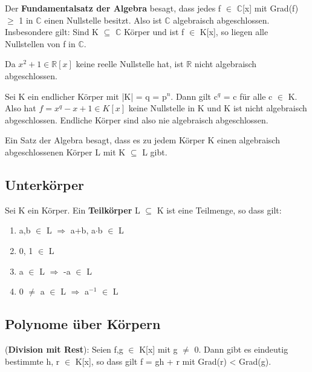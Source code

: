 \begin{remark}
\leavevmode
\begin{compactenum}
\item Der \textbf{Fundamentalsatz der Algebra} besagt, dass jedes f $\in$ $\mathbb{C}$[x] mit Grad(f) $\ge$ 1 in $\mathbb{C}$ einen Nullstelle besitzt. Also ist $\mathbb{C}$ algebraisch abgeschlossen. Insbesondere gilt: Sind K $\subseteq$ $\mathbb{C}$ Körper und ist f $\in$ K[x], so liegen alle Nullstellen von f in $\mathbb{C}$.
\item Da $x^2 + 1 \in \mathbb{R}[x]$ keine reelle Nullstelle hat, ist $\mathbb{R}$ nicht algebraisch abgeschlossen.
\item Sei K ein endlicher Körper mit |K| = q = p$^n$. Dann gilt c$^q$ = c für alle c $\in$ K. Also hat $f = x^q - x+1 \in K[x]$ keine Nullstelle in K und K ist nicht algebraisch abgeschlossen. Endliche Körper sind also nie algebraisch abgeschlossen.
\item Ein Satz der Algebra besagt, dass es zu jedem Körper K einen algebraisch abgeschlossenen Körper L mit K $\subseteq$ L gibt.
\end{compactenum}
\end{remark}

\subsection{Unterkörper}
\begin{definition}
Sei K ein Körper. Ein \textbf{Teilkörper}  L $\subseteq$ K ist eine Teilmenge, so dass gilt:
\begin{enumerate}
\item a,b $\in$ L $\Rightarrow$ a+b, a$\cdot$b $\in$ L
\item 0, 1 $\in$ L
\item a $\in$ L $\Rightarrow$ -a $\in$ L
\item 0 $\neq$ a $\in$ L $\Rightarrow$ a$^{-1}$ $\in$ L
\end{enumerate}
\end{definition}

\subsection{Polynome über Körpern}
\begin{proposition}
(\textbf{Division mit Rest}): Seien f,g $\in$ K[x] mit g $\neq$ 0. Dann gibt es eindeutig bestimmte h, r $\in$ K[x], so dass gilt f = gh + r mit Grad(r) < Grad(g).
\end{proposition}

